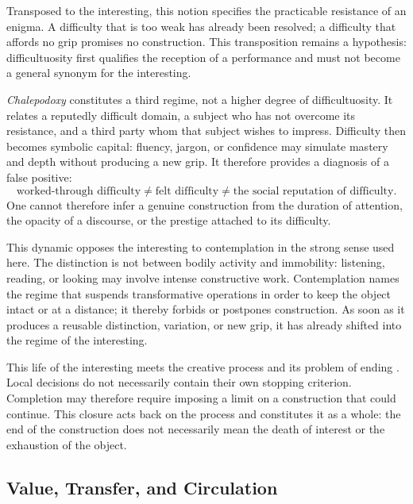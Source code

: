 \documentclass[11pt,a4paper]{article}
\begin{document}
Transposed to the interesting, this notion specifies the practicable resistance
of an enigma. A difficulty that is too weak has already been resolved; a
difficulty that affords no grip promises no construction. This transposition
remains a hypothesis: difficultuosity first qualifies the reception of a
performance and must not become a general synonym for the interesting.

\emph{Chalepodoxy} constitutes a third regime, not a higher degree of
difficultuosity. It relates a reputedly difficult domain, a subject who has not
overcome its resistance, and a third party whom that subject wishes to impress.
Difficulty then becomes symbolic capital: fluency, jargon, or confidence may
simulate mastery and depth without producing a new grip. It therefore provides
a diagnosis of a false positive:
\[
  \text{worked-through difficulty}
  \neq \text{felt difficulty}
  \neq \text{the social reputation of difficulty}.
\]
One cannot therefore infer a genuine construction from the duration of
attention, the opacity of a discourse, or the prestige attached to its
difficulty.

This dynamic opposes the interesting to contemplation in the strong sense used
here. The distinction is not between bodily activity and immobility: listening,
reading, or looking may involve intense constructive work. Contemplation names
the regime that suspends transformative operations in order to keep the object
intact or at a distance; it thereby forbids or postpones construction. As soon
as it produces a reusable distinction, variation, or new grip, it has already
shifted into the regime of the interesting.

This life of the interesting meets the creative process and its problem of
ending \parencite{pachet2026impossibilite}. Local decisions do not necessarily
contain their own stopping criterion. Completion may therefore require imposing
a limit on a construction that could continue. This closure acts back on the
process and constitutes it as a whole: the end of the construction does not
necessarily mean the death of interest or the exhaustion of the object.

\subsection{Value, Transfer, and Circulation}
\end{document}
